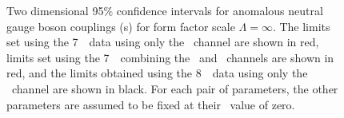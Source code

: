 \begin{figure}[htbp]
\begin{center}
\caption[Two dimensional 95\% confidence intervals for anomalous neutral
           gauge boson couplings (\TGC s) for form factor scale
           $\Lambda=\infty$.]{  Two dimensional 95\% confidence intervals for anomalous neutral
           gauge boson couplings (\TGC s) for form factor scale
           $\Lambda=\infty$. The limits set
           using the 7~\tev\ data using only the \ZZllll\ channel are shown in
           red, limits set using the 7~\tev\ combining the \ZZllll\ and \ZZllvv\
           channels are shown in red, and the limits obtained using the 8~\tev\
           data using only the \ZZllll\ channel are shown in black. For each pair of parameters, the other parameters
           are assumed to be fixed at their \sm\ value of zero. 
}
\label{fig:TGC-limits-2D}
\end{center}
\end{figure}


